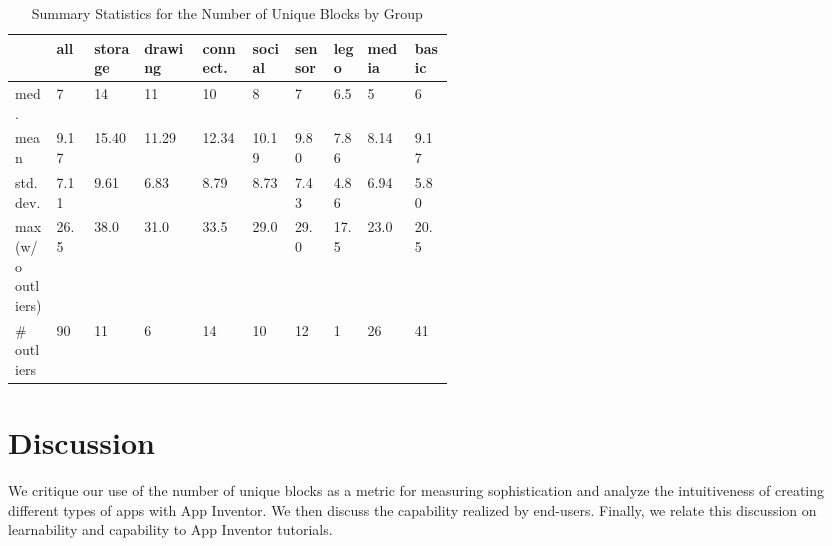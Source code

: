\documentclass[conference]{IEEEtran}
\begin{document}
\begin{table}[h!]
\renewcommand{\arraystretch}{1.3}
\caption{Summary Statistics for the Number of Unique Blocks by Group}
\label{table_noub_stats}
\centering
\begin{tabular}{| p{0.043\linewidth} | p{0.043\linewidth} | p{0.06\linewidth} | p{0.07\linewidth} | p{0.067\linewidth} | p{0.05\linewidth} | p{0.048\linewidth} | p{0.036\linewidth} | p{0.05\linewidth} | p{0.04\linewidth}|}
\hline

&all
&storage
&drawing
&connect.
&social
&sensor
&lego
&media
&basic\\
\hline \hline

med.
&7
&14
&11
&10
&8
&7
&6.5
&5
&6\\
\hline

mean&
9.17&
15.40&
11.29&
12.34&
10.19&
9.80&
7.86&
8.14&
9.17\\
\hline

std. dev.&
7.11&
9.61&
6.83&
8.79&
8.73&
7.43&
4.86&
6.94&
5.80\\
\hline

max (w/o outliers)&
26.5&
38.0&
31.0&
33.5&
29.0&
29.0&
17.5&
23.0&
20.5\\
\hline

\# outliers&
90&
11&
6&
14&
10&
12&
1&
26&
41\\
\hline


\hline

\end{tabular}
\end{table}

\section{Discussion}
We critique our use of the number of unique blocks as a metric for measuring sophistication and analyze the intuitiveness of creating different types of apps with App Inventor. We then discuss the capability realized by end-users. Finally, we relate this discussion on learnability and capability to App Inventor tutorials.
\end{document}
